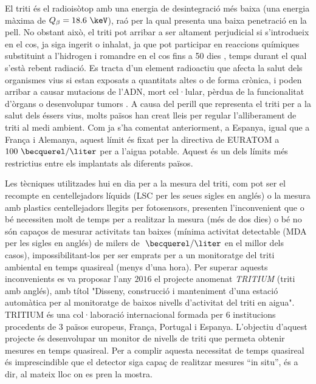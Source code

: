 El triti és el radioisòtop amb una energia de desintegració més baixa (una energia màxima de $Q_\beta=18.6~\keV$), raó per la qual presenta una baixa penetració en la pell. No obstant això, el triti pot arribar a ser altament perjudicial si s'introdueix en el cos, ja siga ingerit o inhalat, ja que pot participar en reaccions químiques substituint a l'hidrogen i romandre en el cos fins a 50 dies \cite{EstimationTritiumDosiKangarooRats, TissueDistribution}, temps durant el qual s'està rebent radiació. Es tracta d'un element radioactiu que afecta la salut dels organismes vius si estan exposats a quantitats altes o de forma crònica, i poden arribar a causar mutacions de l'ADN, mort cel·lular, pèrdua de la funcionalitat d'òrgans o desenvolupar tumors \cite{StraumeTritiumHazard}. A causa del perill que representa el triti per a la salut dels éssers vius, molts països han creat lleis per regular l'alliberament de triti al medi ambient. Com ja s'ha comentat anteriorment, a Espanya, igual que a França i Alemanya, aquest límit és fixat per la directiva de EURATOM a $100~\becquerel/\liter$ per a l'aigua potable. Aquest és un dels límits més restrictius entre els implantats als diferents països.

Les tècniques utilitzades hui en dia per a la mesura del triti, com pot ser el recompte en centellejadors líquids (LSC per les seues sigles en anglés) o la mesura amb plastics centellejadors llegits per fotosensors, presenten l'inconvenient que o bé necessiten molt de temps per a realitzar la mesura (més de dos dies) o bé no són capaços de mesurar activitats tan baixes (mínima activitat detectable (MDA per les sigles en anglés) de milers de $~\becquerel/\liter$ en el millor dels casos), impossibilitant-los per ser emprats per a un monitoratge del triti ambiental en temps quasireal (menys d'una hora). Per superar aquests inconvenients es va proposar l'any $2016$ el projecte anomenat \textit{TRITIUM} (triti amb anglés), amb títol "Disseny, construcció i manteniment d'una estació automàtica per al monitoratge de baixos nivells d'activitat del triti en aigua". TRITIUM és una col·laboració internacional formada per $6$ institucions procedents de $3$ països europeus, França, Portugal i Espanya. L'objectiu d'aquest projecte és desenvolupar un monitor de nivells de triti que permeta obtenir mesures en temps quasireal. Per a complir aquesta necessitat de temps quasireal és imprescindible que el detector siga capaç de realitzar mesures ``in situ'', és a dir, al mateix lloc on es pren la mostra.

